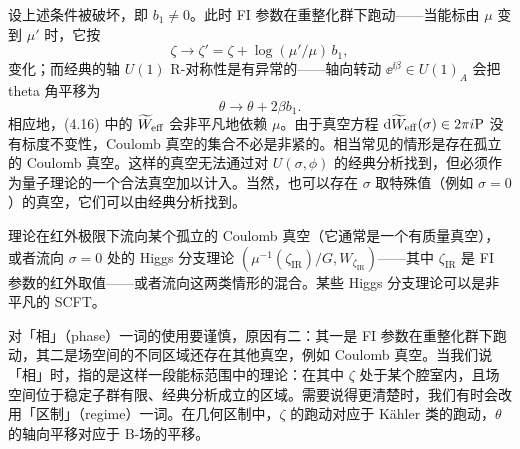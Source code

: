 

设上述条件被破坏，即 $b_1\neq 0$。此时 FI 参数在重整化群下跑动——当能标由 $\mu$ 变到 $\mu'$ 时，它按
\begin{equation}
    \zeta \to \zeta' = \zeta + \log(\mu'/\mu)\,b_1, \tag{4.21}
\end{equation}
变化；而经典的轴 $U(1)$ R-对称性是有异常的——轴向转动 $\ee^{\ii\beta}\in U(1)_A$ 会把 theta 角平移为
\begin{equation}
    \theta \to \theta + 2\beta b_1. \tag{4.22}
\end{equation}
相应地，(4.16) 中的 $\widetilde{W}_{\mathrm{eff}}$ 会非平凡地依赖 $\mu$。由于真空方程 $\mathrm{d}\widetilde{W}_{\mathrm{eff}}(\sigma)\in 2\pi i\mathrm{P}$ 没有标度不变性，Coulomb 真空的集合不必是非紧的。相当常见的情形是存在孤立的 Coulomb 真空。这样的真空无法通过对 $U(\sigma,\phi)$ 的经典分析找到，但必须作为量子理论的一个合法真空加以计入。当然，也可以存在 $\sigma$ 取特殊值（例如 $\sigma=0$）的真空，它们可以由经典分析找到。

理论在红外极限下流向某个孤立的 Coulomb 真空（它通常是一个有质量真空），或者流向 $\sigma=0$ 处的 Higgs 分支理论 $(\mu^{-1}(\zeta_{\mathrm{IR}})/G,W_{\zeta_{\mathrm{IR}}})$——其中 $\zeta_{\mathrm{IR}}$ 是 FI 参数的红外取值——或者流向这两类情形的混合。某些 Higgs 分支理论可以是非平凡的 SCFT。

对「相」（phase）一词的使用要谨慎，原因有二：其一是 FI 参数在重整化群下跑动，其二是场空间的不同区域还存在其他真空，例如 Coulomb 真空。当我们说「相」时，指的是这样一段能标范围中的理论：在其中 $\zeta$ 处于某个腔室内，且场空间位于稳定子群有限、经典分析成立的区域。需要说得更清楚时，我们有时会改用「区制」（regime）一词。在几何区制中，$\zeta$ 的跑动对应于 Kähler 类的跑动，$\theta$ 的轴向平移对应于 B-场的平移。

